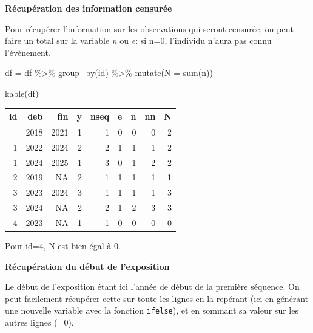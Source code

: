 \documentclass[
  12pt,
  letterpaper,
  DIV=11,
  numbers=noendperiod,
  onepage,
  openany]{scrreprt}
\newenvironment{Shaded}{\begin{snugshade}}{\end{snugshade}}
\newcommand{\AttributeTok}[1]{\textcolor[rgb]{0.80,0.80,0.80}{#1}}
\newcommand{\FunctionTok}[1]{\textcolor[rgb]{0.94,0.94,0.56}{#1}}
\newcommand{\NormalTok}[1]{\textcolor[rgb]{0.80,0.80,0.80}{#1}}
\newcommand{\OtherTok}[1]{\textcolor[rgb]{0.94,0.94,0.56}{#1}}
\newcommand{\SpecialCharTok}[1]{\textcolor[rgb]{0.86,0.64,0.64}{#1}}
\begin{document}
\textbf{Récupération des information censurée}

Pour récupérer l'information sur les observations qui seront censurée,
on peut faire un total sur la variable \emph{n} ou \emph{e}: si n=0,
l'individu n'aura pas connu l'évènement.

\begin{Shaded}
\begin{Highlighting}[]
\NormalTok{df }\OtherTok{=}\NormalTok{ df }\SpecialCharTok{\%\textgreater{}\%} \FunctionTok{group\_by}\NormalTok{(id) }\SpecialCharTok{\%\textgreater{}\%} \FunctionTok{mutate}\NormalTok{(}\AttributeTok{N  =} \FunctionTok{sum}\NormalTok{(n)) }

\FunctionTok{kable}\NormalTok{(df)}
\end{Highlighting}
\end{Shaded}

\begin{longtable}[]{@{}rrrrrrrrr@{}}
\toprule\noalign{}
id & deb & fin & y & nseq & e & n & nn & N \\
\midrule\noalign{}
\endhead
\bottomrule\noalign{}
\endlastfoot
1 & 2018 & 2021 & 1 & 1 & 0 & 0 & 0 & 2 \\
1 & 2022 & 2024 & 2 & 2 & 1 & 1 & 1 & 2 \\
1 & 2024 & 2025 & 1 & 3 & 0 & 1 & 2 & 2 \\
2 & 2019 & NA & 2 & 1 & 1 & 1 & 1 & 1 \\
3 & 2023 & 2024 & 3 & 1 & 1 & 1 & 1 & 3 \\
3 & 2024 & NA & 2 & 2 & 1 & 2 & 3 & 3 \\
4 & 2023 & NA & 1 & 1 & 0 & 0 & 0 & 0 \\
\end{longtable}

Pour id=4, N est bien égal à 0.

\textbf{Récupération du début de l'exposition}

Le début de l'exposition étant ici l'année de début de la première
séquence. On peut facilement récupérer cette sur toute les lignes en la
repérant (ici en générant une nouvelle variable avec la fonction
\texttt{ifelse}), et en sommant sa valeur sur les autres lignes (=0).
\end{document}
